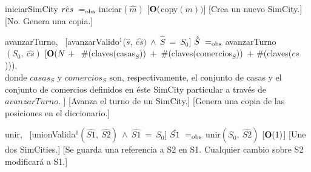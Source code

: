 \begin{Interfaz}
    \InterfazFuncion
    {iniciar}{}{SimCity}
    {$\hat{res}\ \igobs\ $iniciar$(\hat{m})$}
    [$\bold{O}($copy$(m))$]
    [Crea un nuevo SimCity.]
    [No. Genera una copia.]

    \InterfazFuncion
    {avanzarTurno}{,\ }{}
    [avanzarValido$^{1}$($\hat{s},\ \hat{cs})\ \land\ \hat{S}\ =\ S_0$]
    {$\hat{S}\ \igobs\ $avanzarTurno$(S_0,\ \hat{cs})$}
    [$\bold{O}(N\ + \ $ \#(claves(casas$_S$))\ +\ \#(claves(comercios$_S$))\ + \#(claves($cs$))), \\ \tab
        donde $casas_{S}$ y $comercios_{S}$ son, respectivamente, el conjunto de casas y el conjunto de comercios \tab definidos en éste SimCity particular a través de $avanzarTurno$.
    ]
    [Avanza el turno de un SimCity.]
    [Genera una copia de las posiciones en el diccionario.]

    \InterfazFuncion
    {unir}{,\ }{}
    [unionValida$^{1}(\hat{S1},\ \hat{S2})\ \land\ \hat{S1}\ =\ S_0$]
    {$\hat{S1}\ \igobs\ $unir$(S_0,\ \hat{S2})$}
    [$\bold{O}(1)$]
    [Une dos SimCities.]
    [Se guarda una referencia a S2 en S1. Cualquier cambio sobre S2 modificará a S1.]

    \vfill{}
\end{Interfaz}